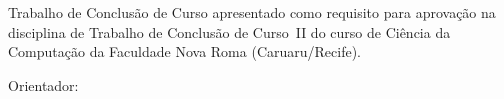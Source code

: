 \begingroup
\singlespacing
\begin{center}
\vspace*{1.2cm}

{\bfseries \tccautor}

\vfill

{\large\bfseries \tcctitulo}
\end{center}

\vspace{1.2cm}

\hspace*{7cm}\begin{minipage}{7.5cm}
\singlespacing\small
Trabalho de Conclusão de Curso apresentado como requisito para aprovação na
disciplina de Trabalho de Conclusão de Curso~II do curso de Ciência da
Computação da Faculdade Nova Roma (Caruaru/Recife).

\vspace{0.8cm}
Orientador: \tccorientador
\end{minipage}

\vfill

\begin{center}
{\bfseries \MakeUppercase{\tcclocal}}\\[2pt]
{\bfseries \tccano}
\end{center}
\vspace*{0.6cm}
\endgroup
\newpage
